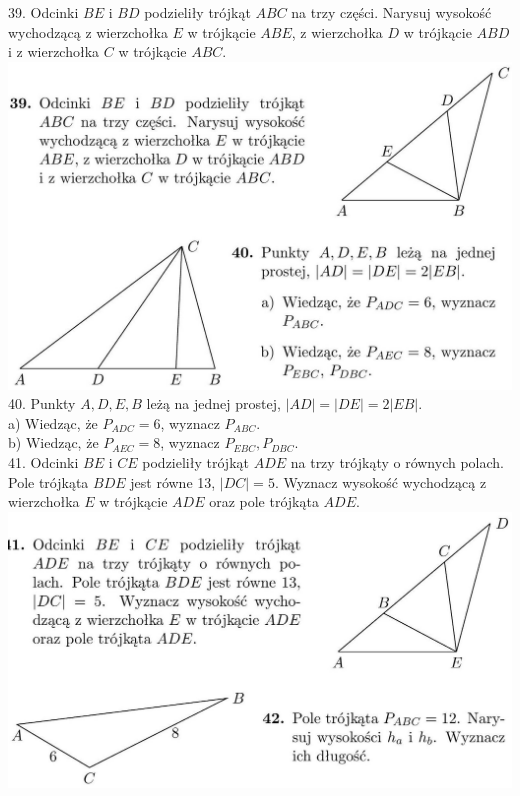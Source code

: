 \documentclass[10pt]{article}
\begin{document}
39. Odcinki \(B E\) i \(B D\) podzieliły trójkąt \(A B C\) na trzy części. Narysuj wysokość wychodzącą z wierzchołka \(E\) w trójkącie \(A B E\), z wierzchołka \(D\) w trójkącie \(A B D\) i z wierzchołka \(C\) w trójkącie \(A B C\).\\
\includegraphics[max width=\textwidth, center]{2024_11_21_8f01584889ff06348ae7g-198(2)}\\
40. Punkty \(A, D, E, B\) leżą na jednej prostej, \(|A D|=|D E|=2|E B|\).\\
a) Wiedząc, że \(P_{A D C}=6\), wyznacz \(P_{A B C}\).\\
b) Wiedząc, że \(P_{A E C}=8\), wyznacz \(P_{E B C}, P_{D B C}\).\\
41. Odcinki \(B E\) i \(C E\) podzieliły trójkąt \(A D E\) na trzy trójkąty o równych polach. Pole trójkąta \(B D E\) jest równe 13, \(|D C|=5\). Wyznacz wysokość wychodzącą z wierzchołka \(E\) w trójkącie \(A D E\) oraz pole trójkąta \(A D E\).\\
\includegraphics[max width=\textwidth, center]{2024_11_21_8f01584889ff06348ae7g-198(1)}\\
\end{document}
